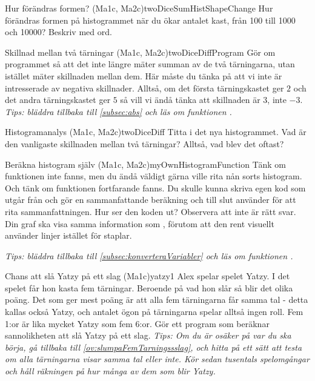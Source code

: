 \begin{matteovning}{Hur förändras formen? (Ma1c, Ma2c)}{twoDiceSumHistShapeChange}
Hur förändras formen på histogrammet när du ökar antalet kast, från 100 till 1000 och 10000? Beskriv med ord.
\end{matteovning}

\begin{matteovning}{Skillnad mellan två tärningar (Ma1c, Ma2c)}{twoDiceDiffProgram}
Gör om programmet så att det inte längre mäter summan av de två tärningarna, utan istället mäter skillnaden mellan dem. Här måste du tänka på att vi inte är intresserade av negativa skillnader. Alltså, om det första tärningskastet ger $2$ och det andra tärningskastet ger $5$ så vill vi ändå tänka att skillnaden är $3$, inte $-3$.
\newline
\newline
\emph{Tips: bläddra tillbaka till \autoref{subsec:abs} och läs om funktionen .}
\end{matteovning}

\begin{matteovning}{Histogramanalys (Ma1c, Ma2c)}{twoDiceDiff}
Titta i det nya histogrammet. Vad är den vanligaste skillnaden mellan två tärningar? Alltså, vad blev det oftast?
\end{matteovning}

\begin{matteovningm}{Beräkna histogram själv (Ma1c, Ma2c)}{myOwnHistogramFunction}
Tänk om funktionen  inte fanns, men du ändå väldigt gärna ville rita nån sorts histogram. Och tänk om funktionen  fortfarande fanns. Du skulle kunna skriva egen kod som utgår från  och gör en sammanfattande beräkning och till slut använder  för att rita sammanfattningen. Hur ser den koden ut? Observera att  inte är rätt svar. Din graf ska visa samma information som , förutom att den rent visuellt använder linjer istället för staplar.


\emph{Tips: bläddra tillbaka till \autoref{subsec:konverteraVariabler} och läs om funktionen .}
\end{matteovningm}

\begin{matteovning}{Chans att slå Yatzy på ett slag (Ma1c)}{yatzy1}
Alex spelar spelet Yatzy. I det spelet får hon kasta fem tärningar. Beroende på vad hon slår så blir det olika poäng. Det som ger mest poäng är att alla fem tärningarna får samma tal - detta kallas också Yatzy, och antalet ögon på tärningarna spelar alltså ingen roll. Fem 1:or är lika mycket Yatzy som fem 6:or. Gör ett program som beräknar sannolikheten att slå Yatzy på ett slag.
\newline
\newline
\emph{Tips: Om du är osäker på var du ska börja, gå tillbaka till \autoref{ov:slumpaFemTarningssslag}, och hitta på ett sätt att testa om alla tärningarna visar samma tal eller inte. Kör sedan tusentals spelomgångar och håll räkningen på hur många av dem som blir Yatzy.
}\end{matteovning}

